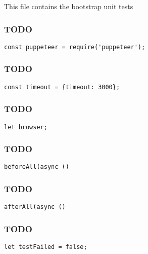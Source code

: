\documentclass[a4paper]{article}
\begin{document}
This file contains the bootstrap unit tests

\hypertarget{toc660}{}
\subsubsection{TODO}

\begin{lstlisting}
const puppeteer = require('puppeteer');
\end{lstlisting}

\hypertarget{toc661}{}
\subsubsection{TODO}

\begin{lstlisting}
const timeout = {timeout: 3000};
\end{lstlisting}

\hypertarget{toc662}{}
\subsubsection{TODO}

\begin{lstlisting}
let browser;
\end{lstlisting}

\hypertarget{toc663}{}
\subsubsection{TODO}

\begin{lstlisting}
beforeAll(async ()
\end{lstlisting}

\hypertarget{toc664}{}
\subsubsection{TODO}

\begin{lstlisting}
afterAll(async ()
\end{lstlisting}

\hypertarget{toc665}{}
\subsubsection{TODO}

\begin{lstlisting}
let testFailed = false;
\end{lstlisting}
\end{document}
